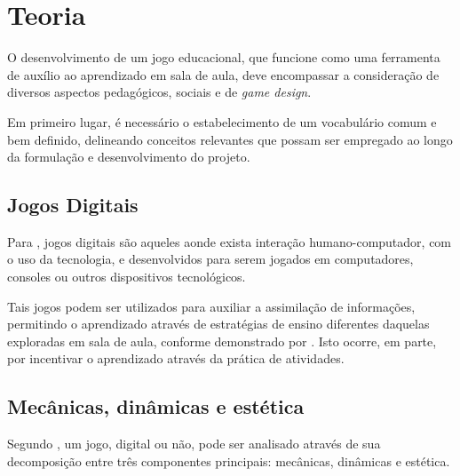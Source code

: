
\chapter{Teoria}\label{cap-teoria}

O desenvolvimento de um jogo educacional, que funcione como uma ferramenta de auxílio ao
aprendizado em sala de aula, deve encompassar a consideração de diversos aspectos
pedagógicos, sociais e de \textit{game design}.

Em primeiro lugar, é necessário o estabelecimento de um vocabulário comum e bem
definido, delineando conceitos relevantes que possam ser empregado ao longo da 
formulação e desenvolvimento do projeto.

\section{Jogos Digitais}\label{sec-jogosdigitais}

Para \cite{correia:2009:digital_games_spore}, jogos digitais são aqueles aonde exista
interação humano-computador, com o uso da tecnologia, e desenvolvidos para serem 
jogados em computadores, consoles ou outros dispositivos tecnológicos.

Tais jogos podem ser utilizados para auxiliar a assimilação de informações, permitindo
o aprendizado através de estratégias de ensino diferentes daquelas exploradas em sala
de aula, conforme demonstrado por \cite{fernandes:2012:digital_education}. Isto 
ocorre, em parte, por incentivar o aprendizado através da prática de atividades.


\section{Mecânicas, dinâmicas e estética}\label{sec-mecanica-dinamica-estetica}

Segundo \cite{hunicke:2004}, um jogo, digital ou não, pode ser analisado através de
sua decomposição entre três componentes principais: mecânicas, dinâmicas e estética.


